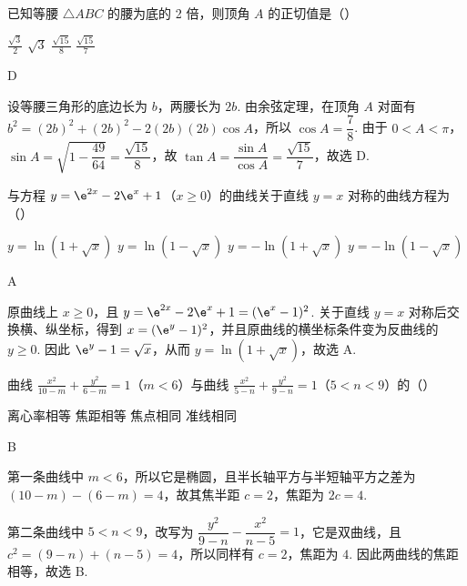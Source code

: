 \begin{problem}
已知等腰 \(\triangle ABC\) 的腰为底的 2 倍，则顶角 \(A\) 的正切值是（\quad）

\choices
    {\(\frac{\sqrt{3}}{2}\)}
    {\(\sqrt{3}\)}
    {\(\frac{\sqrt{15}}{8}\)}
    {\(\frac{\sqrt{15}}{7}\)}
\end{problem}

\begin{answer}
D
\end{answer}

\begin{solution}
设等腰三角形的底边长为 \(b\)，两腰长为 \(2b\). 由余弦定理，在顶角 \(A\) 对面有 \(b^2=(2b)^2+(2b)^2-2(2b)(2b)\cos A\)，所以 \(\cos A=\dfrac78\). 由于 \(0<A<\pi\)，\(\sin A=\sqrt{1-\dfrac{49}{64}}=\dfrac{\sqrt{15}}8\)，故 \(\tan A=\dfrac{\sin A}{\cos A}=\dfrac{\sqrt{15}}7\)，故选 D.
\end{solution}

\begin{problem}
与方程 \( y = \e^{2x} - 2\e^{x} + 1 \)（\(x \geqslant 0\)）的曲线关于直线 \( y = x \) 对称的曲线方程为（\quad）

\choices
    {\( y = \ln (1 + \sqrt{x}) \)}
    {\( y = \ln (1 - \sqrt{x}) \)}
    {\( y = -\ln (1 + \sqrt{x}) \)}
    {\( y = -\ln (1 - \sqrt{x}) \)}
\end{problem}

\begin{answer}
A
\end{answer}

\begin{solution}
原曲线上 \(x\geqslant0\)，且 \(y=\e^{2x}-2\e^x+1=(\e^x-1)^2\). 关于直线 \(y=x\) 对称后交换横、纵坐标，得到 \(x=(\e^y-1)^2\)，并且原曲线的横坐标条件变为反曲线的 \(y\geqslant0\). 因此 \(\e^y-1=\sqrt{x}\)，从而 \(y=\ln(1+\sqrt{x})\)，故选 A.
\end{solution}

\begin{problem}
曲线 \(\frac{x^2}{10 - m} + \frac{y^2}{6 - m} = 1\)（\(m < 6\)）与曲线 \(\frac{x^2}{5 - n} + \frac{y^2}{9 - n} = 1\)（\(5 < n < 9\)）的（\quad）

\choices
    {离心率相等}
    {焦距相等}
    {焦点相同}
    {准线相同}
\end{problem}

\begin{answer}
B
\end{answer}

\begin{solution}
第一条曲线中 \(m<6\)，所以它是椭圆，且半长轴平方与半短轴平方之差为 \((10-m)-(6-m)=4\)，故其焦半距 \(c=2\)，焦距为 \(2c=4\).

第二条曲线中 \(5<n<9\)，改写为 \(\dfrac{y^2}{9-n}-\dfrac{x^2}{n-5}=1\)，它是双曲线，且 \(c^2=(9-n)+(n-5)=4\)，所以同样有 \(c=2\)，焦距为 \(4\). 因此两曲线的焦距相等，故选 B.
\end{solution}

